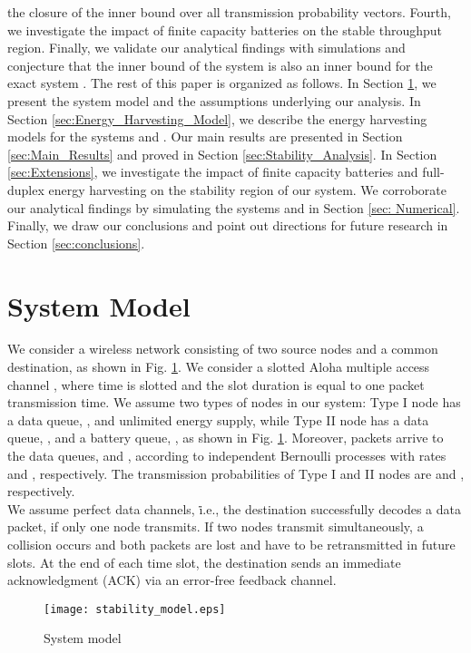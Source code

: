 \documentclass[draftcls,12pt,onecolumn]{IEEEtran}
\begin{document}
the closure of the inner bound over all transmission probability vectors. Fourth, we investigate the impact of finite capacity batteries on the stable throughput region. Finally, we validate our analytical findings with simulations and conjecture that the inner bound of the system  is also an inner bound for the exact system .
\newline \indent The rest of this paper is organized as follows. In Section \ref{sec:System_Model}, we present the system model and the assumptions underlying our analysis. In Section \ref{sec:Energy_Harvesting_Model}, we describe the energy harvesting models for the systems  and . Our main results are presented in Section \ref{sec:Main_Results} and proved in Section \ref{sec:Stability_Analysis}. In Section \ref{sec:Extensions}, we investigate the impact of finite capacity batteries and full-duplex energy harvesting on the stability region of our system. We corroborate our analytical findings by simulating the systems  and  in Section \ref{sec: Numerical}. Finally, we draw our conclusions and point out directions for future research in Section \ref{sec:conclusions}.
\section{System Model} \label{sec:System_Model}
We consider a wireless network consisting of two source nodes and a common destination, as shown in Fig. \ref{fig:EH_model}. We consider a slotted Aloha multiple access channel \cite{abramson1970aloha}, where time is slotted and the slot duration is equal to one packet transmission time. We assume two types of nodes in our system: Type I node has a data queue, , and unlimited energy supply, while Type II node has a data queue, , and a battery queue, , as shown in Fig. \ref{fig:EH_model}. Moreover, packets arrive to the data queues,  and , according to independent Bernoulli processes with rates  and , respectively. The transmission probabilities of Type I and II nodes are  and , respectively.\\
\indent We assume perfect data channels, \.i.e., the destination successfully decodes a data packet, if only one node transmits. If two nodes transmit simultaneously, a collision occurs and both packets are lost and have to be retransmitted in future slots. At the end of each time slot, the destination sends an immediate acknowledgment (ACK) via an error-free feedback channel.
\begin{figure}[t]
\texttt{[image: stability\_model.eps]}
\centering
\caption{System model}\label{fig:EH_model}
\end{figure}
\end{document}
